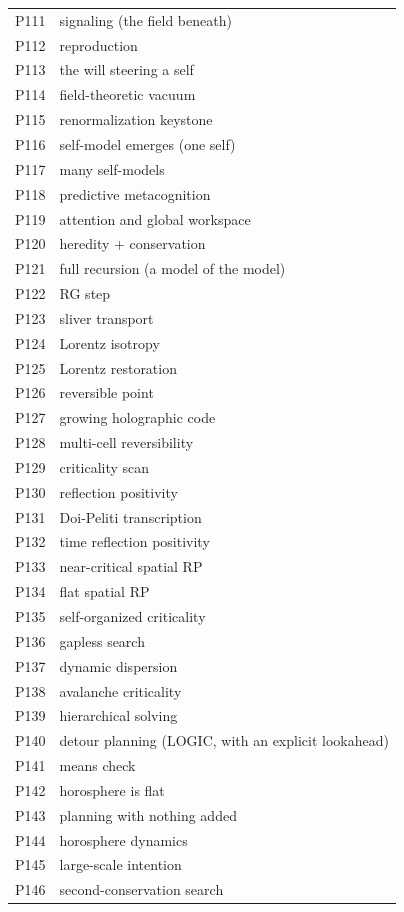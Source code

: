 \begin{small}
\begin{longtable}{p{0.7cm}p{13.5cm}}
P111 & signaling (the field beneath) \\
P112 & reproduction \\
P113 & the will steering a self \\
P114 & field-theoretic vacuum \\
P115 & renormalization keystone \\
P116 & self-model emerges (one self) \\
P117 & many self-models \\
P118 & predictive metacognition \\
P119 & attention and global workspace \\
P120 & heredity + conservation \\
P121 & full recursion (a model of the model) \\
P122 & RG step \\
P123 & sliver transport \\
P124 & Lorentz isotropy \\
P125 & Lorentz restoration \\
P126 & reversible point \\
P127 & growing holographic code \\
P128 & multi-cell reversibility \\
P129 & criticality scan \\
P130 & reflection positivity \\
P131 & Doi-Peliti transcription \\
P132 & time reflection positivity \\
P133 & near-critical spatial RP \\
P134 & flat spatial RP \\
P135 & self-organized criticality \\
P136 & gapless search \\
P137 & dynamic dispersion \\
P138 & avalanche criticality \\
P139 & hierarchical solving \\
P140 & detour planning (LOGIC, with an explicit lookahead) \\
P141 & means check \\
P142 & horosphere is flat \\
P143 & planning with nothing added \\
P144 & horosphere dynamics \\
P145 & large-scale intention \\
P146 & second-conservation search \\

\end{longtable}
\end{small}
